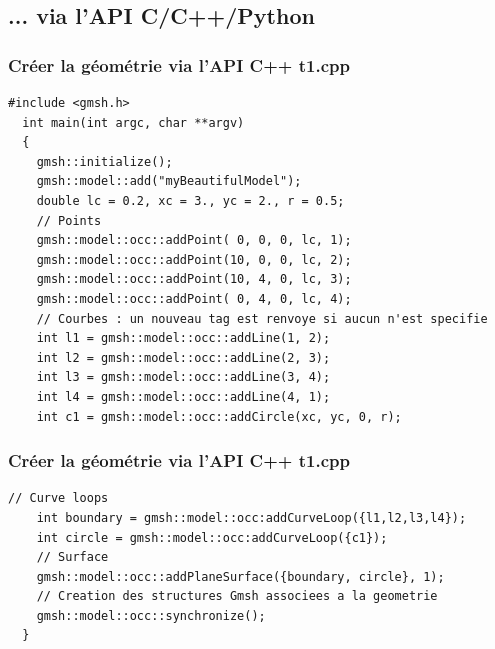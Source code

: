 \documentclass[aspectratio=169]{beamer}
\begin{document}
\subsection{... via l'API C/C++/Python}

\begin{frame}[fragile]
\frametitle{Créer la géométrie via l'API C++ \hfill t1.cpp}
  \footnotesize
  \begin{lstlisting}[]
  #include <gmsh.h>
  int main(int argc, char **argv)
  {
    gmsh::initialize();
    gmsh::model::add("myBeautifulModel");
    double lc = 0.2, xc = 3., yc = 2., r = 0.5;
    // Points
    gmsh::model::occ::addPoint( 0, 0, 0, lc, 1);
    gmsh::model::occ::addPoint(10, 0, 0, lc, 2);
    gmsh::model::occ::addPoint(10, 4, 0, lc, 3);
    gmsh::model::occ::addPoint( 0, 4, 0, lc, 4);
    // Courbes : un nouveau tag est renvoye si aucun n'est specifie
    int l1 = gmsh::model::occ::addLine(1, 2);
    int l2 = gmsh::model::occ::addLine(2, 3);
    int l3 = gmsh::model::occ::addLine(3, 4);
    int l4 = gmsh::model::occ::addLine(4, 1);
    int c1 = gmsh::model::occ::addCircle(xc, yc, 0, r);
  \end{lstlisting}
\end{frame}

\begin{frame}[fragile]
\frametitle{Créer la géométrie via l'API C++ \hfill t1.cpp}
  \footnotesize
  \begin{lstlisting}[]
    // Curve loops
    int boundary = gmsh::model::occ:addCurveLoop({l1,l2,l3,l4});
    int circle = gmsh::model::occ:addCurveLoop({c1});
    // Surface
    gmsh::model::occ::addPlaneSurface({boundary, circle}, 1);
    // Creation des structures Gmsh associees a la geometrie
    gmsh::model::occ::synchronize();
  }
  \end{lstlisting}
\end{frame}
\end{document}

